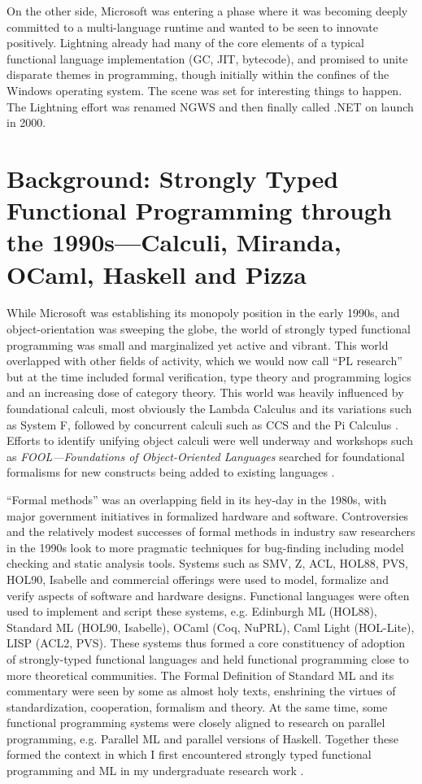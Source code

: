 \documentclass[acmsmall]{acmart}\settopmatter{}
\begin{document}
On the other side, Microsoft was entering a phase where it was becoming deeply committed to a multi-language runtime and wanted to be
seen to innovate positively.  Lightning already had many of the core elements of a typical functional language implementation (GC, JIT, bytecode), and
promised to unite disparate themes in programming, though initially within the confines of the Windows operating system. The scene was set
for interesting things to happen. The Lightning effort was renamed NGWS and then finally called .NET on launch in 2000.  

\section*{Background: Strongly Typed Functional Programming through the 1990s---Calculi, Miranda, OCaml, Haskell and Pizza}

While Microsoft was establishing its monopoly position in the early 1990s, and object-orientation was sweeping the globe, the world of strongly
typed functional programming was small and marginalized yet active and vibrant.  This world overlapped with other fields of activity, which we
would now call “PL research” but at the time included formal verification, type theory and programming logics and an increasing dose of category
theory. This world was heavily influenced by foundational calculi, most obviously the Lambda Calculus and its variations such as System F, followed by
concurrent calculi such as CCS and the Pi Calculus \citep{Sangiorgi2001}.  Efforts to identify unifying object calculi were well
underway \citep{Abadi1996} and workshops such as \textit{FOOL---Foundations of Object-Oriented Languages} searched
for foundational formalisms for new constructs being added to
existing languages \citep{Workshop95foundationsof}.

“Formal methods” was an overlapping field in its hey-day in the 1980s, with major government initiatives in formalized hardware and software.
Controversies \citep{Restivo2004} and the relatively modest successes of formal methods in industry saw researchers in the 1990s look to more pragmatic
techniques for bug-finding including model checking and static analysis tools. Systems such as SMV, Z, ACL, HOL88, PVS, HOL90, Isabelle and commercial
offerings were used to model, formalize and verify aspects of software and hardware designs.   Functional languages were often used to implement and
script these systems, e.g. Edinburgh ML (HOL88), Standard ML (HOL90, Isabelle), OCaml (Coq, NuPRL), Caml Light (HOL-Lite), LISP (ACL2, PVS).  These systems
thus formed a core constituency of adoption of strongly-typed functional languages and held functional programming close to more theoretical
communities.  The Formal Definition of Standard ML \citep{Milner1990} and its commentary were seen by some as almost holy texts, enshrining
the virtues of standardization, cooperation, formalism and theory. At the same time, some functional programming systems were closely aligned to research
on parallel programming, e.g. Parallel ML \citep{RabhGorlatch} and parallel versions of Haskell.  Together these formed the context in which I first
encountered strongly typed functional programming and ML in my undergraduate research work \citep{Syme1993}.
\end{document}
